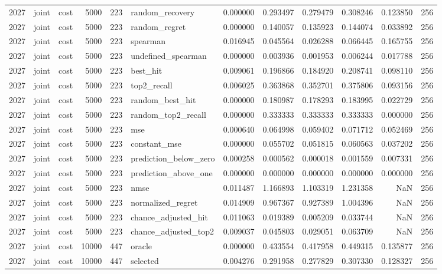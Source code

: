 \begin{tabular}{rllrrlrrrrrr}
2027 & joint & cost & 5000 & 223 & random_recovery & 0.000000 & 0.293497 & 0.279479 & 0.308246 & 0.123850 & 256 \\
2027 & joint & cost & 5000 & 223 & random_regret & 0.000000 & 0.140057 & 0.135923 & 0.144074 & 0.033892 & 256 \\
2027 & joint & cost & 5000 & 223 & spearman & 0.016945 & 0.045564 & 0.026288 & 0.066445 & 0.165755 & 256 \\
2027 & joint & cost & 5000 & 223 & undefined_spearman & 0.000000 & 0.003936 & 0.001953 & 0.006244 & 0.017788 & 256 \\
2027 & joint & cost & 5000 & 223 & best_hit & 0.009061 & 0.196866 & 0.184920 & 0.208741 & 0.098110 & 256 \\
2027 & joint & cost & 5000 & 223 & top2_recall & 0.006025 & 0.363868 & 0.352701 & 0.375806 & 0.093156 & 256 \\
2027 & joint & cost & 5000 & 223 & random_best_hit & 0.000000 & 0.180987 & 0.178293 & 0.183995 & 0.022729 & 256 \\
2027 & joint & cost & 5000 & 223 & random_top2_recall & 0.000000 & 0.333333 & 0.333333 & 0.333333 & 0.000000 & 256 \\
2027 & joint & cost & 5000 & 223 & mse & 0.000640 & 0.064998 & 0.059402 & 0.071712 & 0.052469 & 256 \\
2027 & joint & cost & 5000 & 223 & constant_mse & 0.000000 & 0.055702 & 0.051815 & 0.060563 & 0.037202 & 256 \\
2027 & joint & cost & 5000 & 223 & prediction_below_zero & 0.000258 & 0.000562 & 0.000018 & 0.001559 & 0.007331 & 256 \\
2027 & joint & cost & 5000 & 223 & prediction_above_one & 0.000000 & 0.000000 & 0.000000 & 0.000000 & 0.000000 & 256 \\
2027 & joint & cost & 5000 & 223 & nmse & 0.011487 & 1.166893 & 1.103319 & 1.231358 & NaN & 256 \\
2027 & joint & cost & 5000 & 223 & normalized_regret & 0.014909 & 0.967367 & 0.927389 & 1.004396 & NaN & 256 \\
2027 & joint & cost & 5000 & 223 & chance_adjusted_hit & 0.011063 & 0.019389 & 0.005209 & 0.033744 & NaN & 256 \\
2027 & joint & cost & 5000 & 223 & chance_adjusted_top2 & 0.009037 & 0.045803 & 0.029051 & 0.063709 & NaN & 256 \\
2027 & joint & cost & 10000 & 447 & oracle & 0.000000 & 0.433554 & 0.417958 & 0.449315 & 0.135877 & 256 \\
2027 & joint & cost & 10000 & 447 & selected & 0.004276 & 0.291958 & 0.277829 & 0.307330 & 0.128327 & 256 \\

\end{tabular}
